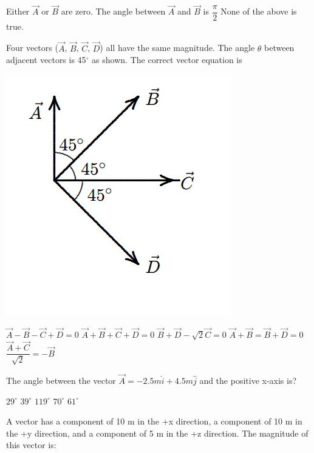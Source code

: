\documentclass[12pt,addpoints]{exam}
\begin{document}
{{{\begin{questions}
\begin{choices}
						\choice Either $\vec{A}$ or $\vec{B}$ are zero.
						\choice The angle between $\vec{A}$ and $\vec{B}$ is $\dfrac{\pi}{2}$
						\choice None of the above is true.
					\end{choices}
					\question Four vectors ($\vec{A}$, $\vec{B}$, $\vec{C}$, $\vec{D}$) all have the same magnitude. The angle $\theta$ between adjacent vectors
					is 45$^\circ$ as shown. The correct vector equation is
					\begin{center}
						\includegraphics[scale=0.4]{vecs2.png}
					\end{center} 
					\begin{oneparchoices}
						\choice $\vec{A}-\vec{B}-\vec{C}+\vec{D}=0$
						\choice $\vec{A}+\vec{B}+\vec{C}+\vec{D}=0$ 
						\choice $\vec{B}+\vec{D}-\sqrt{2}\vec C=0$
						\choice $\vec{A}+\vec{B}=\vec{B}+\vec{D}=0$
						\choice $\dfrac{\vec{A}+\vec{C}}{\sqrt{2}}=-\vec{B}$	
					\end{oneparchoices}
					\question The angle between the vector $\vec{A}=-2.5m\hat i+4.5m\hat j$ and the positive x-axis is? \\ 
					\begin{oneparchoices}
						\choice $29^\circ$
						\choice $39^\circ$
						\choice $119^\circ$
						\choice $70^\circ$
						\choice $61^\circ$
					\end{oneparchoices}
					\question A vector has a component of 10 m in the +x direction, a component of 10 m in the +y direction,
					and a component of 5 m in the +z direction. The magnitude of this vector is: \\

\end{questions}}}}
\end{document}
